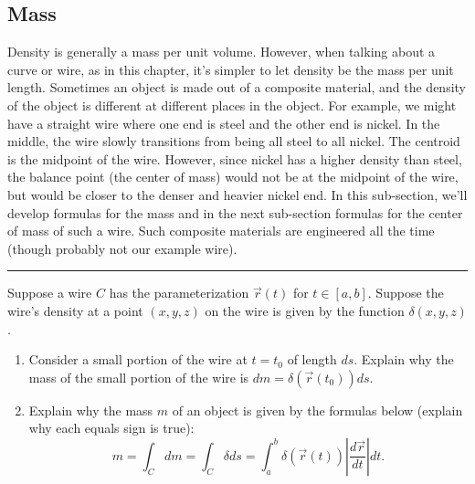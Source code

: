 \subsection{Mass}
Density is generally a mass per unit volume.  However, when talking about a curve or wire, as in this chapter, it's simpler to let density be the mass per unit length.  Sometimes an object is made out of a composite material, and the density of the object is different at different places in the object. For example, we might have a straight wire where one end is steel and the other end is nickel. In the middle, the wire slowly transitions from being all steel to all nickel.  The centroid is the midpoint of the wire.  However, since nickel has a higher density than steel, the balance point (the center of mass) would not be at the midpoint of the wire, but would be closer to the denser and heavier nickel end.  In this sub-section, we'll develop formulas for the mass and in the next sub-section formulas for the center of mass of such a wire. Such composite materials are engineered all the time (though probably not our example wire).  

\hrule

\begin{problem}[Mass]\label{mass of curve}%
%
 Suppose a wire $C$ has the parameterization $\vec r(t)$ for $t\in[a,b]$.  Suppose the wire's density at a point $(x,y,z)$ on the wire is given by the function $\delta(x,y,z)$. 
 \begin{enumerate}
  \item Consider a small portion of the wire at $t=t_0$ of length $ds$.  Explain why the mass of the small portion of the wire is $dm=\delta(\vec r(t_0)) ds$.
  \item Explain why the mass $m$ of an object is given by the formulas below (explain why each equals sign is true):
$$m=\int_C dm = \int_C \delta ds = \int_a^b \delta(\vec r(t)) \left|\frac{d\vec r}{dt}\right|dt.$$
 \end{enumerate}
\end{problem}

